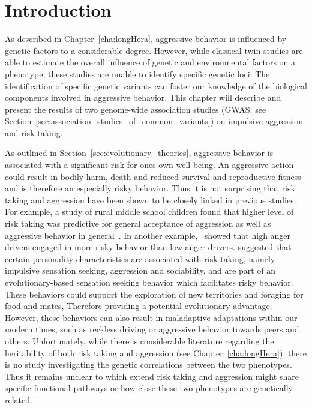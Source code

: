 \section{Introduction}
\label{sec:introduction_assoc}

As described in Chapter~\ref{cha:longHera}, aggressive behavior is influenced by genetic factors to a considerable degree.
However, while classical twin studies are able to estimate the overall influence of genetic and environmental factors on a phenotype, these studies are unable to identify specific genetic loci.
The identification of specific genetic variants can foster our knowledge of the biological components involved in aggressive behavior. 
This chapter will describe and present the results of two genome-wide association studies (GWAS; see Section~\ref{sec:association_studies_of_common_variants}) on impulsive aggression and risk taking.

As outlined in Section~\ref{sec:evolutionary_theories}, aggressive behavior is associated with a significant risk for ones own well-being.
An aggressive action could result in bodily harm, death and reduced survival and reproductive fitness and is therefore an especially risky behavior.
Thus it is not surprising that risk taking and aggression have been shown to be closely linked in previous studies.
For example, a study of rural middle school children found that higher level of risk taking was  predictive for general acceptance of aggression as well as aggressive behavior in general~\cite{Swaim2004}.
In another example,~\citet{Deffenbacher2003} showed that high anger drivers engaged in more risky behavior than low anger drivers.
\citet{Zuckerman2000} suggested that certain personality characteristics are associated with risk taking, namely impulsive sensation seeking, aggression and sociability, and are part of an evolutionary-based sensation seeking behavior which facilitates risky behavior.
These behaviors could support the exploration of new territories and foraging for food and mates,
Therefore providing a potential evolutionary advantage.
However, these behaviors can also result in maladaptive adaptations within our modern times, such as reckless driving or aggressive behavior towards peers and others.
Unfortunately, while there is considerable literature regarding the heritability of both risk taking and aggression (see Chapter~\ref{cha:longHera}), there is no study investigating the genetic correlations between the two phenotypes.
Thus it remains unclear to which extend risk taking and aggression might share specific functional pathways or how close these two phenotypes are genetically related.

